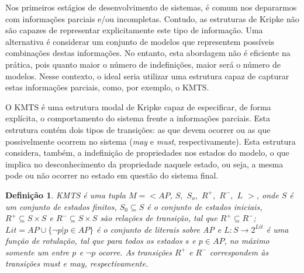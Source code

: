 \documentclass[normaltoc,capchap,capsec,times]{abnt}
\newtheorem{defi}{Definição}[section]
\begin{document}

Nos primeiros estágios de desenvolvimento de sistemas, é comum nos depararmos com informações parciais e/ou incompletas. Contudo, as estruturas de Kripke não são capazes de representar explicitamente este tipo de informação. Uma alternativa é considerar um conjunto de modelos que representem possíveis combinações destas informações. No entanto, esta abordagem não é eficiente na prática, pois quanto maior o número de indefinições, maior será o número de modelos. Nesse contexto, o ideal seria utilizar uma estrutura capaz de capturar estas informações parciais, como, por exemplo, o KMTS.

O KMTS é uma estrutura modal de Kripke capaz de especificar, de forma explícita, o comportamento do sistema frente a informações parciais. Esta estrutura contém dois tipos de transições: as que devem ocorrer ou as que possivelmente ocorrem no sistema (\textit{may} e \textit{must}, respectivamente). Esta estrutura considera, também, a indefinição de propriedades nos estados do modelo, o que implica no desconhecimento da propriedade naquele estado, ou seja, a mesma pode ou não ocorrer no estado em questão do sistema final. \cite{huthKMTS}

\begin{defi}\cite{aline}
\textnormal{KMTS é uma tupla $M = < AP$, $S,$ $S_o,$  $R^+,$ $R^-,$  $ L$ $ > $, onde $S$ é um conjunto de estados finitos, $S_0 \subseteq S$ é o conjunto de estados iniciais, $R^+ \subseteq S \times S$ e $R^- \subseteq S \times S$  são relações de transição, tal que $R^+ \subseteq R^-$; $Lit = {AP \cup \{ \neg p | p \in AP\}}$ é o conjunto de literais sobre AP e $L: S \to 2^{Lit}$ é uma função de rotulação, tal que para todos os estados $s$ e $p \in AP$, no máximo somente um entre $p$ e $\neg p$ ocorre. As transições $R^+$ e $R^-$ correspondem às transições \textit{must} e \textit{may}, respectivamente.
}
\end{defi}

%
\end{document}
